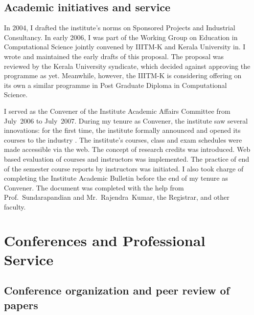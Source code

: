 \documentclass[titlepage, %
11pt, 
]{article}
\begin{document}
\subsection{Academic initiatives and service}
\label{subsec:computational-science}

In 2004, I drafted the institute's norms on Sponsored
Projects and Industrial Consultancy.  In early 2006, I was
part of the Working Group on Education in Computational
Science jointly convened by IIITM-K and Kerala University
in.  I wrote and maintained the early drafts of this
proposal.  The proposal was reviewed by the Kerala
University syndicate, which decided against approving the
programme as yet.  Meanwhile, however, the IIITM-K is
considering offering on its own a similar programme in Post
Graduate Diploma in Computational Science.

I served as the Convener of the Institute Academic Affairs
Committee from July~2006 to July~2007.  During my tenure as
Convener, the institute saw several innovations: for the
first time, the institute formally announced and opened its
courses to the industry .  The institute's courses, class
and exam schedules were made accessible via the web.  The
concept of research credits was introduced.  Web based
evaluation of courses and instructors was implemented.  The
practice of end of the semester course reports by
instructors was initiated.  I also took charge of completing
the Institute Academic Bulletin before the end of my tenure
as Convener.  The document was completed with the help from
Prof.~Sundarapandian and Mr.~Rajendra~Kumar, the Registrar,
and other faculty.

\section{Conferences and Professional Service}
\label{sec:conf}

\subsection{Conference organization and peer review of
  papers}
\label{subsec:conf-org}
\end{document}
